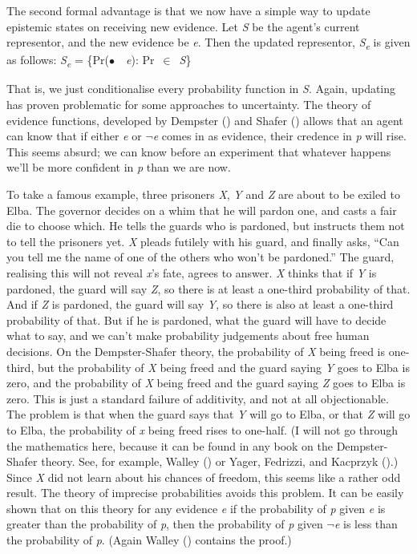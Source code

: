 \documentclass[
  10pt,
  letterpaper,
  DIV=11,
  numbers=noendperiod,
  twoside]{scrartcl}
\begin{document}
The second formal advantage is that we now have a simple way to update
epistemic states on receiving new evidence. Let \emph{S} be the agent's
current representor, and the new evidence be \emph{e}. Then the updated
representor, \emph{S\textsubscript{e}} is given as follows:
\emph{S\textsubscript{e}} = \{Pr(\(\bullet\)~\textbar~\emph{e}):
Pr~\(\in\)~\emph{S}\}

That is, we just conditionalise every probability function in \emph{S}.
Again, updating has proven problematic for some approaches to
uncertainty. The theory of evidence functions, developed by Dempster
() and Shafer
() allows that an agent can know that if
either \emph{e} or \(\neg\)\emph{e} comes in as evidence, their credence
in \emph{p} will rise. This seems absurd; we can know before an
experiment that whatever happens we'll be more confident in \emph{p}
than we are now.

To take a famous example, three prisoners \emph{X}, \emph{Y} and
\emph{Z} are about to be exiled to Elba. The governor decides on a whim
that he will pardon one, and casts a fair die to choose which. He tells
the guards who is pardoned, but instructs them not to tell the prisoners
yet. \emph{X} pleads futilely with his guard, and finally asks, ``Can
you tell me the name of one of the others who won't be pardoned.'' The
guard, realising this will not reveal \emph{x}'s fate, agrees to answer.
\emph{X} thinks that if \emph{Y} is pardoned, the guard will say
\emph{Z}, so there is at least a one-third probability of that. And if
\emph{Z} is pardoned, the guard will say \emph{Y}, so there is also at
least a one-third probability of that. But if he is pardoned, what the
guard will have to decide what to say, and we can't make probability
judgements about free human decisions. On the Dempster-Shafer theory,
the probability of \emph{X} being freed is one-third, but the
probability of \emph{X} being freed and the guard saying \emph{Y} goes
to Elba is zero, and the probability of \emph{X} being freed and the
guard saying \emph{Z} goes to Elba is zero. This is just a standard
failure of additivity, and not at all objectionable. The problem is that
when the guard says that \emph{Y} will go to Elba, or that \emph{Z} will
go to Elba, the probability of \emph{x} being freed rises to one-half.
(I will not go through the mathematics here, because it can be found in
any book on the Dempster-Shafer theory. See, for example, Walley
() or Yager, Fedrizzi, and Kacprzyk
().) Since \emph{X} did not learn about
his chances of freedom, this seems like a rather odd result. The theory
of imprecise probabilities avoids this problem. It can be easily shown
that on this theory for any evidence \emph{e} if the probability of
\emph{p} given \emph{e} is greater than the probability of \emph{p},
then the probability of \emph{p} given \(\neg\)\emph{e} is less than the
probability of \emph{p}. (Again Walley ()
contains the proof.)
\end{document}
